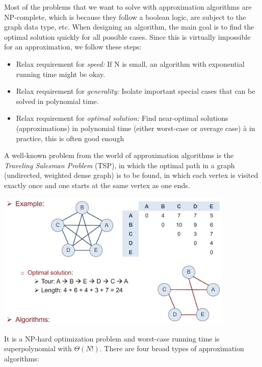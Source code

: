 Most of the problems that we want to solve with approximation algorithms are NP-complete, which is because they follow a boolean logic, are subject to the graph data type, etc. When designing an algorithm, the main goal is to find the optimal solution quickly for all possible cases. Since this is virtually impossible for an approximation, we follow these steps:

\begin{itemize}
    \item Relax requirement for \emph{speed:} If N is small, an algorithm with exponential running time might be okay.
    \item Relax requirement for \emph{generality:} Isolate important special cases that can be solved in polynomial time.
    \item Relax requirement for \emph{optimal solution:} Find near-optimal solutions (approximations) in polynomial time (either worst-case or average case) à in practice, this is often good enough
\end{itemize}

A well-known problem from the world of approximation algorithms is the \emph{Traveling Salesman Problem} (TSP), in which the optimal path in a graph (undirected, weighted dense graph) is to be found, in which each vertex is visited exactly once and one starts at the same vertex as one ends. 

\begin{center}\includegraphics[width=0.85\textwidth]{img/approximation/TspOptimalSolution.png}\end{center}

It is a NP-hard optimization problem and worst-case running time is superpolynomial with $\Theta(N!)$. There are four broad types of approximation algorithms:

